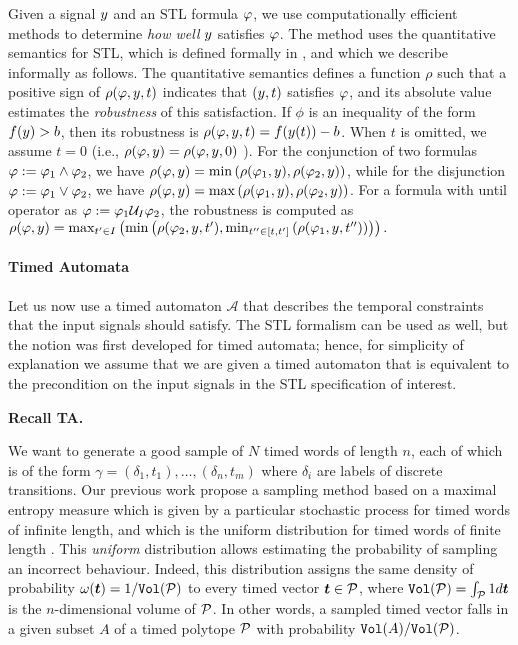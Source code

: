 Given a signal $y$ and an STL formula $\varphi$, we use computationally efficient methods to determine \emph{how well} $y$ satisfies $\varphi$.
The method uses the quantitative semantics for STL, which 
is defined formally in \cite{DonzeM10}, and which we describe informally as follows. The
quantitative semantics defines a function $\rho$ such that a positive sign of
$\rho(\varphi,y,t)$ indicates that $(y,t)$ satisfies
$\varphi$, and its absolute value estimates the \emph{robustness} of
this satisfaction. If $\phi$ is an inequality of the form
$f(y)>b$, then its robustness is $\rho(\varphi,y,t) = f(y(t))-b$.  
When $t$ is omitted, we assume $t=0$ (i.e., $\rho(\varphi,y)=\rho(\varphi,y,0)$ ).
For the conjunction of two
formulas $\varphi := \varphi_1 \wedge \varphi_2$, we have
$\rho(\varphi,y)=\min \left( \rho(\varphi_1,y),\rho(\varphi_2,y)\right)$,
while for the disjunction $\varphi := \varphi_1 \vee \varphi_2$, we have
$\rho(\varphi,y)=\max\left(\rho(\varphi_1,y),\rho(\varphi_2,y)\right)$.
For a formula with until operator as $\varphi := \varphi_1 \mathcal{U}_I \varphi_2$,
the robustness is computed as $\rho(\varphi,y) = \max_{t^\prime\in
  I}\left(\min\left(\rho(\varphi_2,y,t^\prime),\min_{t^{\prime\prime}\in
  [t,t^\prime]}\left(\rho(\varphi_1,y,t^{\prime\prime})\right)\right)\right).$


\paragraph{Timed Automata}
Let us now use a timed automaton $\mathcal{A}$ that describes the temporal constraints that the input signals should satisfy. The STL formalism can be used as well, but the notion was first developed for timed automata; hence, for simplicity of explanation we assume that we are given a timed automaton that is equivalent to the precondition on the input signals in the STL specification of interest. 

{\bf Recall TA.}


We want to generate a good sample of $N$ timed words of length $n$, each of which is of the form $\gamma = (\delta_1, t_1), \ldots, (\delta_n, t_m)$ where $\delta_i$ are labels of discrete transitions. Our previous work \cite{maxent,BBBK16} propose a sampling method based on a maximal entropy measure which is given by a particular stochastic process \cite{maxent} for timed words of infinite length, and which is the uniform distribution for timed words of finite length \cite{BBBK16}. This \emph{uniform} distribution allows estimating the probability of sampling an incorrect behaviour. Indeed, this distribution assigns the same density of probability $\omega(\vec t) = 1/\Vol(\tpol)$ to every timed vector $\vec t\in\tpol$, where $\Vol(\tpol)=\int_{\tpol} 1 d\vec t$ is the $n$-dimensional volume of $\mathcal{P}$. In other words, a sampled timed vector falls in a given subset $A$ of a timed polytope $\mathcal{P}$ with probability $\mathtt{Vol}(A)/\mathtt{Vol}(\mathcal{P})$. 


